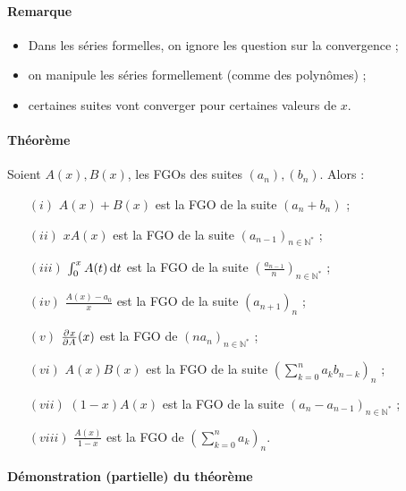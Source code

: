 \documentclass{article}
\newenvironment{lst}
	{\begin{minipage}[t]{.9\linewidth}\begin{itemize}}
	{\end{itemize}\end{minipage}}
\begin{document}
			\paragraph{Remarque}
			\begin{lst}
				\item Dans les séries formelles, on ignore les question sur la convergence ;
				\item on manipule les séries formellement (comme des polynômes) ;
				\item certaines suites vont converger pour certaines valeurs de $x$.
			\end{lst}

			\paragraph{Théorème} Soient $A(x), B(x)$, les FGOs des suites $(a_n), (b_n)$. Alors :

			\begin{itemize}
				\item[$(i)$]    $A(x) + B(x)$ est la FGO de la suite $(a_n + b_n)$ ;
				\item[$(ii)$]   $xA(x)$ est la FGO de la suite $(a_{n-1})_{n\in\mathbb N^*}$ ;
				\item[$(iii)$]  $\int_0^xA(t)\dif t$ est la FGO de la suite $\left(\frac {a_{n-1}}n\right)_{n\in\mathbb N^*}$ ;
				\item[$(iv)$]   $\frac {A(x) - a_0}x$ est la FGO de la suite $(a_{n+1})_n$ ;
				\item[$(v)$]    $\pd xA(x)$ est la FGO de $(na_n)_{n\in\mathbb N^*}$ ;
				\item[$(vi)$]   $A(x)B(x)$ est la FGO de la suite $\left(\sum_{k=0}^na_kb_{n-k}\right)_n$ ;
				\item[$(vii)$]  $(1-x)A(x)$ est la FGO de la suite $\left(a_n - a_{n-1}\right)_{n\in\mathbb N^*}$ ;
				\item[$(viii)$] $\frac {A(x)}{1-x}$ est la FGO de $\left(\sum_{k=0}^na_k\right)_n$.
			\end{itemize}

			\paragraph{Démonstration (partielle) du théorème}
\end{document}
